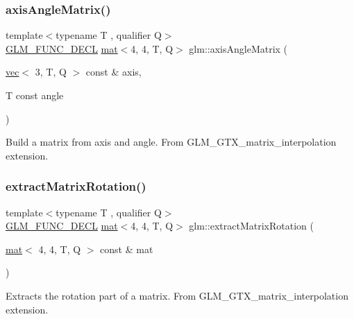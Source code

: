 \subsubsection{\texorpdfstring{axis\+Angle\+Matrix()}{axisAngleMatrix()}}
{\footnotesize\ttfamily template$<$typename T , qualifier Q$>$ \\
\hyperlink{setup_8hpp_ab2d052de21a70539923e9bcbf6e83a51}{G\+L\+M\+\_\+\+F\+U\+N\+C\+\_\+\+D\+E\+CL} \hyperlink{structglm_1_1mat}{mat}$<$4, 4, T, Q$>$ glm\+::axis\+Angle\+Matrix (\begin{DoxyParamCaption}\item[{\hyperlink{structglm_1_1vec}{vec}$<$ 3, T, Q $>$ const \&}]{axis,  }\item[{T const}]{angle }\end{DoxyParamCaption})}

Build a matrix from axis and angle. From G\+L\+M\+\_\+\+G\+T\+X\+\_\+matrix\+\_\+interpolation extension. \mbox{\label{group__gtx__matrix__interpolation_ga8834d4499a1a52fcf531b4506f0b5f67}} 
\subsubsection{\texorpdfstring{extract\+Matrix\+Rotation()}{extractMatrixRotation()}}
{\footnotesize\ttfamily template$<$typename T , qualifier Q$>$ \\
\hyperlink{setup_8hpp_ab2d052de21a70539923e9bcbf6e83a51}{G\+L\+M\+\_\+\+F\+U\+N\+C\+\_\+\+D\+E\+CL} \hyperlink{structglm_1_1mat}{mat}$<$4, 4, T, Q$>$ glm\+::extract\+Matrix\+Rotation (\begin{DoxyParamCaption}\item[{\hyperlink{structglm_1_1mat}{mat}$<$ 4, 4, T, Q $>$ const \&}]{mat }\end{DoxyParamCaption})}

Extracts the rotation part of a matrix. From G\+L\+M\+\_\+\+G\+T\+X\+\_\+matrix\+\_\+interpolation extension. \mbox{\label{group__gtx__matrix__interpolation_gad5fc63a2e084000b39f6508ab07421a5}} 
